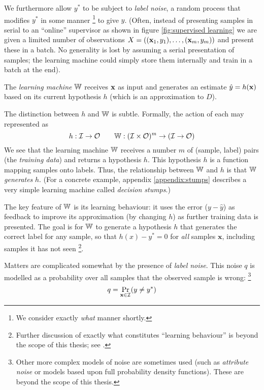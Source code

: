 We furthermore allow $y^{\ast}$ to be subject to \emph{label noise}, a
random process that modifies $y^{\ast}$ in some manner%
\footnote{We consider exactly \emph{what} manner shortly.}
to give $y$.  (Often, instead of presenting samples in serial to an
``online'' supervisor as shown in figure \ref{fig:supervised learning}
we are given a limited number of observations $X = ((\mathbf{x}_1, y_1),
\ldots, (\mathbf{x}_m, y_m))$ and present these in a batch.  No generality
is lost by assuming a serial presentation of samples; the learning
machine could simply store them internally and train in a batch at the
end).

The \emph{learning machine} $\mathbb{W}$ receives $\mathbf{x}$ as input and
generates an estimate $\hat{y} = h(\mathbf{x})$ based on its current
hypothesis $h$ (which is an approximation to $D$).

The distinction between $h$ and $\mathbb{W}$ is subtle.  Formally, the
action of each may represented as
%
\begin{equation}
h : \mathcal{I} \rightarrow \mathcal{O} \qquad \mathbb{W} : (\mathcal{I} \times \mathcal{O})^m
\rightarrow (\mathcal{I} \rightarrow \mathcal{O})
\end{equation}
%
We see that the learning machine $\mathbb{W}$ receives a number $m$ of
(sample, label) pairs (the \emph{training data}) and returns a
hypothesis $h$.  This hypothesis $h$ is a function mapping samples
onto labels.  Thus, the relationship between $\mathbb{W}$ and $h$ is that
$\mathbb{W}$ \emph{generates} $h$.  (For a concrete example, appendix
\ref{appendix:stumps} describes a very simple learning machine called
\emph{decision stumps}.)

The key feature of $\mathbb{W}$ is its learning behaviour: it uses the error
($y - \hat{y}$) as feedback to improve its approximation (by changing
$h$) as further training data is presented.  The goal is for $\mathbb{W}$ to
generate a hypothesis $h$ that generates the correct label for any
sample, so that $h(x) - y^{\ast} = 0$ for \emph{all} samples
$\mathbf{x}$, including samples it has not seen%
\footnote{Further discussion of exactly what constitutes ``learning
behaviour'' is beyond the scope of this thesis; see \cite{Anthony98}.}.

Matters are complicated somewhat by the presence of \emph{label
noise}.  This noise $q$ is modelled as a probability over all samples
that the observed sample is wrong:
\footnote{Other more complex models of noise are sometimes used (such
as \emph{attribute noise} or models based upon full probability
density functions).  These are beyond the scope of this thesis.}
%
\begin{equation}
q = \Pr_{\mathbf{x} \in \mathcal{I}}(y \neq y^{\ast})
\end{equation}

